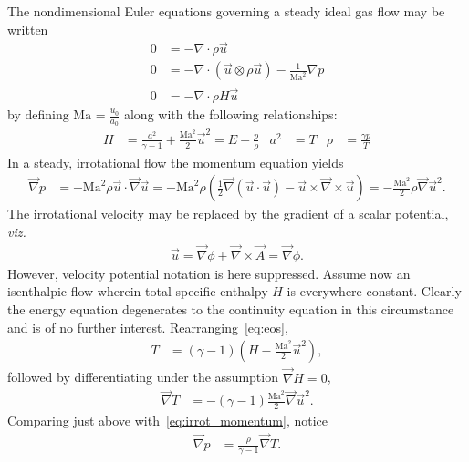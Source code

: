\documentclass[letterpaper,11pt,nointlimits,reqno]{amsart}
\newcommand{\Mach}[1][]{\mbox{Ma}_{#1}}
\begin{document}
The nondimensional Euler equations governing a steady ideal gas flow may be written
\begin{align}
  \label{eq:continuity}
  0
&=
  - \nabla\cdot\rho{}\vec{u}
  \\
  \label{eq:momentum}
  0
&=
  - \nabla\cdot(\vec{u}\otimes\rho{}\vec{u})
  - \frac{1}{\Mach^{2}} \nabla{} p
  \\
  \label{eq:energy}
  0
&=
  - \nabla\cdot\rho{}H\vec{u}
\end{align}
by defining $\Mach = \frac{u_{0}}{a_{0}}$ along with the following
relationships:
\begin{align}
  \label{eq:eos}
  H &= \frac{a^2}{\gamma-1} + \frac{\Mach^2}{2}\vec{u}^2
     = E + \frac{p}{\rho}
  &
  a^2 &= T
  &
  \rho &= \frac{\gamma{} p}{T}
\end{align}
In a steady, irrotational flow the momentum equation yields
\begin{align}
    \vec{\nabla}p
    &= - \Mach^2 \rho \vec{u}\cdot\vec{\nabla}\vec{u}
     = - \Mach^2 \rho \left(
           \frac{1}{2}\vec{\nabla}\left(\vec{u}\cdot\vec{u}\right)
         - \vec{u}\times\vec{\nabla}\times\vec{u}
        \right)
     = - \frac{\Mach^2}{2} \rho \vec{\nabla}\vec{u}^2.
\label{eq:irrot_momentum}
\end{align}
The irrotational velocity may be replaced by the gradient of a scalar
potential, \emph{viz.}
\begin{align}
  \vec{u} = \vec{\nabla}\phi + \vec{\nabla}\times\vec{A} = \vec{\nabla}{\phi}.
\end{align}
However, velocity potential notation is here suppressed. Assume now an
isenthalpic flow wherein total specific enthalpy $H$ is everywhere constant.
Clearly the energy equation degenerates to the continuity equation in this
circumstance and is of no further interest. Rearranging~\eqref{eq:eos},
\begin{align}
  T &= \left(\gamma-1\right)\left(H - \frac{\Mach^2}{2}\vec{u}^2\right),
  \label{eq:T}
\end{align}
followed by differentiating under the assumption $\vec{\nabla}H=0$,
\begin{align}
  \vec{\nabla} T &= -\left(\gamma-1\right)\frac{\Mach^2}{2}\vec{\nabla}\vec{u}^2.
  \label{eq:isen_gradT}
\end{align}
Comparing just above with~\eqref{eq:irrot_momentum}, notice
\begin{align}
  \vec{\nabla}p &= \frac{\rho}{\gamma-1}\vec{\nabla}T.
  \label{irrot_momentum_stag}
\end{align}
\end{document}
